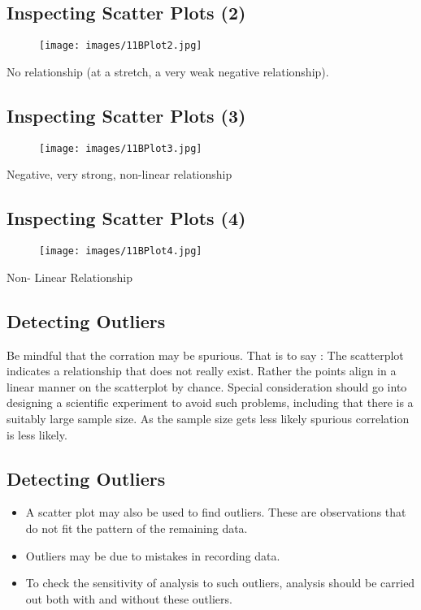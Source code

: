 \documentclass[]{report}
\begin{document}
\subsection*{Inspecting Scatter Plots (2) }
\begin{figure}[h!]
	\texttt{[image: images/11BPlot2.jpg]}\\
\end{figure}

No relationship (at a stretch, a very weak negative relationship).

\subsection*{Inspecting Scatter Plots (3) }
\begin{figure}[h!]
	\texttt{[image: images/11BPlot3.jpg]}\\
	
\end{figure}

Negative, very strong, non-linear relationship



\subsection*{Inspecting Scatter Plots (4) }
\begin{figure}[h!]
	\texttt{[image: images/11BPlot4.jpg]}\\
\end{figure}
Non- Linear Relationship


\subsection{Detecting Outliers}

Be mindful that the corration may be spurious. That is to say : The scatterplot indicates a relationship that does not really exist. Rather the points align in a linear manner on the scatterplot by chance. Special consideration should go into designing a scientific experiment to avoid such problems, including that there is a suitably large sample size. As the sample size gets less likely spurious correlation is less likely. 


\subsection{Detecting Outliers}
\begin{itemize}
	\item A scatter plot may also be used to find outliers. These are
	observations that do not fit the pattern of the remaining data.
	\item Outliers may be due to mistakes in recording data.
	\item To check the sensitivity of analysis to such outliers, analysis should
	be carried out both with and without these outliers.
\end{itemize}
\end{document}
